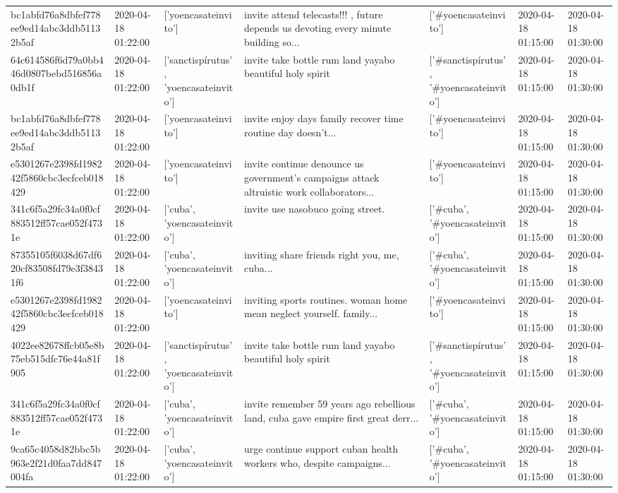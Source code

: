 \begin{tabular}{lllllll}
bc1abfd76a8dbfef778ee9ed14abc3ddb51132b5af & 2020-04-18 01:22:00 & ['yoencasateinvito'] & invite attend telecasts!!! , future depends us devoting every minute building so... & ['#yoencasateinvito'] & 2020-04-18 01:15:00 & 2020-04-18 01:30:00 \\
64c614586f6d79a0bb446d0807bebd516856a0db1f & 2020-04-18 01:22:00 & ['sanctispírutus', 'yoencasateinvito'] & invite take bottle rum land yayabo beautiful holy spirit & ['#sanctispírutus', '#yoencasateinvito'] & 2020-04-18 01:15:00 & 2020-04-18 01:30:00 \\
bc1abfd76a8dbfef778ee9ed14abc3ddb51132b5af & 2020-04-18 01:22:00 & ['yoencasateinvito'] & invite enjoy days family recover time routine day doesn't... & ['#yoencasateinvito'] & 2020-04-18 01:15:00 & 2020-04-18 01:30:00 \\
e5301267e2398fd198242f5860cbc3ecfceb018429 & 2020-04-18 01:22:00 & ['yoencasateinvito'] & invite continue denounce us government's campaigns attack altruistic work collaborators... & ['#yoencasateinvito'] & 2020-04-18 01:15:00 & 2020-04-18 01:30:00 \\
341c6f5a29fc34a0f0cf883512ff57cae052f4731e & 2020-04-18 01:22:00 & ['cuba', 'yoencasateinvito'] & invite use nasobuco going street. & ['#cuba', '#yoencasateinvito'] & 2020-04-18 01:15:00 & 2020-04-18 01:30:00 \\
87355105f6038d67df620cf83508fd79e3f38431f6 & 2020-04-18 01:22:00 & ['cuba', 'yoencasateinvito'] & inviting share friends right you, me, cuba... & ['#cuba', '#yoencasateinvito'] & 2020-04-18 01:15:00 & 2020-04-18 01:30:00 \\
e5301267e2398fd198242f5860cbc3ecfceb018429 & 2020-04-18 01:22:00 & ['yoencasateinvito'] & inviting sports routines. woman home mean neglect yourself. family... & ['#yoencasateinvito'] & 2020-04-18 01:15:00 & 2020-04-18 01:30:00 \\
4022ee82678ffcb05e8b75eb515dfc76e44a81f905 & 2020-04-18 01:22:00 & ['sanctispírutus', 'yoencasateinvito'] & invite take bottle rum land yayabo beautiful holy spirit & ['#sanctispírutus', '#yoencasateinvito'] & 2020-04-18 01:15:00 & 2020-04-18 01:30:00 \\
341c6f5a29fc34a0f0cf883512ff57cae052f4731e & 2020-04-18 01:22:00 & ['cuba', 'yoencasateinvito'] & invite remember 59 years ago rebellious land, cuba gave empire first great derr... & ['#cuba', '#yoencasateinvito'] & 2020-04-18 01:15:00 & 2020-04-18 01:30:00 \\
9ca65c4058d82bbc5b963e2f21d0faa7dd847004fa & 2020-04-18 01:22:00 & ['cuba', 'yoencasateinvito'] & urge continue support cuban health workers who, despite campaigns... & ['#cuba', '#yoencasateinvito'] & 2020-04-18 01:15:00 & 2020-04-18 01:30:00 \\

\end{tabular}
